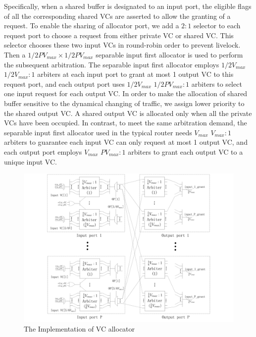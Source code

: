 \documentclass[10pt,conference]{IEEEtran}
\begin{document}
Specifically, when a shared buffer is designated to an input port, the eligible flags of all the corresponding shared VCs are asserted to allow the granting of a request. To enable the sharing of allocator port, we add a $2:1$ selector to each request port to choose a request from either private VC or shared VC. This selector chooses these two input VCs in round-robin order to prevent livelock. Then a $1/2PV_{max}\times 1/2PV_{max}$ separable input first allocator is used to perform the subsequent arbitration. The separable input first allocator employs $1/2V_{max}$ $1/2V_{max}:1$ arbiters at each input port to grant at most 1 output VC to this request port, and each output port uses $1/2V_{max}$ $1/2PV_{max}:1$ arbiters to select one input request for each output VC. In order to make the allocation of shared buffer sensitive to the dynamical changing of traffic, we assign lower priority to the shared output VC. A shared output VC is allocated only when all the private VCs have been occupied. In contrast, to meet the same arbitration demand, the separable input first allocator used in the typical router needs $V_{max}$ $V_{max}:1$ arbiters to guarantee each input VC can only request at most 1 output VC, and each output port employs $V_{max}$ $PV_{max}:1$ arbiters to grant each output VC to a unique input VC.

\begin{figure}
\centering\includegraphics[scale=0.25]{figures/vcalloc.pdf}
\caption{The Implementation of VC allocator}\label{vcallocator}
\end{figure}
\end{document}

